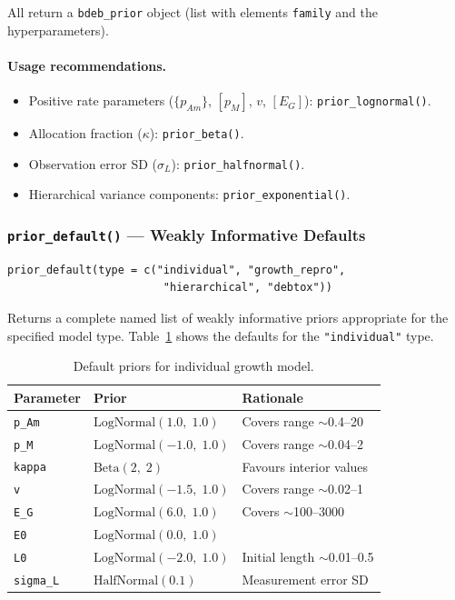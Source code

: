\documentclass[11pt,a4paper]{article}
\newcommand{\fn}[1]{\texttt{#1()}}
\newcommand{\code}[1]{\texttt{#1}}
\begin{document}
All return a \code{bdeb\_prior} object (list with elements \code{family}
and the hyperparameters).

\paragraph{Usage recommendations.}
\begin{itemize}[nosep]
  \item Positive rate parameters ($\{p_{Am}\}$, $[p_M]$, $v$, $[E_G]$): \fn{prior\_lognormal}.
  \item Allocation fraction ($\kappa$): \fn{prior\_beta}.
  \item Observation error SD ($\sigma_L$): \fn{prior\_halfnormal}.
  \item Hierarchical variance components: \fn{prior\_exponential}.
\end{itemize}

\subsubsection{\fn{prior\_default} --- Weakly Informative Defaults}

\begin{lstlisting}
prior_default(type = c("individual", "growth_repro",
                        "hierarchical", "debtox"))
\end{lstlisting}

Returns a complete named list of weakly informative priors appropriate for
the specified model type.  Table~\ref{tab:default-priors} shows the
defaults for the \code{"individual"} type.

\begin{table}[htbp]
\centering
\caption{Default priors for individual growth model.}
\label{tab:default-priors}
\begin{tabular}{lll}
\toprule
\textbf{Parameter} & \textbf{Prior} & \textbf{Rationale} \\
\midrule
\code{p\_Am}    & $\text{LogNormal}(1.0,\; 1.0)$   & Covers range $\sim$0.4--20 \\
\code{p\_M}     & $\text{LogNormal}(-1.0,\; 1.0)$  & Covers range $\sim$0.04--2 \\
\code{kappa}    & $\text{Beta}(2,\; 2)$             & Favours interior values \\
\code{v}        & $\text{LogNormal}(-1.5,\; 1.0)$   & Covers range $\sim$0.02--1 \\
\code{E\_G}     & $\text{LogNormal}(6.0,\; 1.0)$    & Covers $\sim$100--3000 \\
\code{E0}       & $\text{LogNormal}(0.0,\; 1.0)$    & \\
\code{L0}       & $\text{LogNormal}(-2.0,\; 1.0)$   & Initial length $\sim$0.01--0.5 \\
\code{sigma\_L} & $\text{HalfNormal}(0.1)$          & Measurement error SD \\
\bottomrule
\end{tabular}
\end{table}
\end{document}

